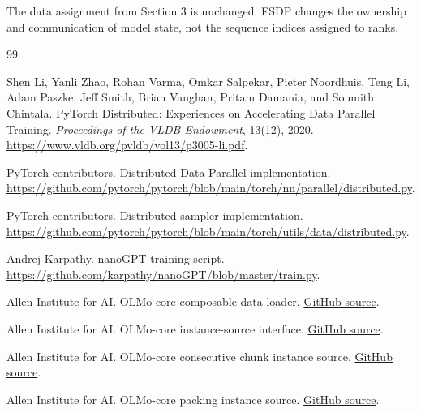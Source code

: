 \documentclass[11pt]{article}
\begin{document}
The data assignment from Section 3 is unchanged. FSDP changes the ownership
and communication of model state, not the sequence indices assigned to ranks.
\begin{thebibliography}{99}

Shen Li, Yanli Zhao, Rohan Varma, Omkar Salpekar, Pieter Noordhuis,
Teng Li, Adam Paszke, Jeff Smith, Brian Vaughan, Pritam Damania, and
Soumith Chintala.
\newblock PyTorch Distributed: Experiences on Accelerating Data Parallel
Training.
\newblock \emph{Proceedings of the VLDB Endowment}, 13(12), 2020.
\newblock \url{https://www.vldb.org/pvldb/vol13/p3005-li.pdf}.

PyTorch contributors.
\newblock Distributed Data Parallel implementation.
\newblock \url{https://github.com/pytorch/pytorch/blob/main/torch/nn/parallel/distributed.py}.

PyTorch contributors.
\newblock Distributed sampler implementation.
\newblock \url{https://github.com/pytorch/pytorch/blob/main/torch/utils/data/distributed.py}.

Andrej Karpathy.
\newblock nanoGPT training script.
\newblock \url{https://github.com/karpathy/nanoGPT/blob/master/train.py}.

Allen Institute for AI.
\newblock OLMo-core composable data loader.
\newblock \href{https://github.com/allenai/OLMo-core/blob/92870a33c3fee060d57c3faec52b0b369ece85a6/src/olmo_core/data/composable/data_loader.py}{GitHub source}.

Allen Institute for AI.
\newblock OLMo-core instance-source interface.
\newblock \href{https://github.com/allenai/OLMo-core/blob/92870a33c3fee060d57c3faec52b0b369ece85a6/src/olmo_core/data/composable/instance_source.py}{GitHub source}.

Allen Institute for AI.
\newblock OLMo-core consecutive chunk instance source.
\newblock \href{https://github.com/allenai/OLMo-core/blob/92870a33c3fee060d57c3faec52b0b369ece85a6/src/olmo_core/data/composable/concat_and_chunk_instance_source.py}{GitHub source}.

Allen Institute for AI.
\newblock OLMo-core packing instance source.
\newblock \href{https://github.com/allenai/OLMo-core/blob/92870a33c3fee060d57c3faec52b0b369ece85a6/src/olmo_core/data/composable/packing_instance_source.py}{GitHub source}.


\end{thebibliography}
\end{document}
